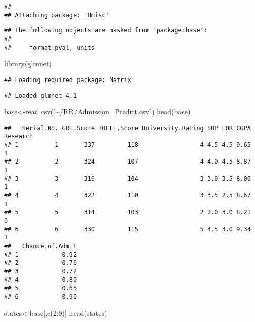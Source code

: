 \documentclass[
]{article}
\newenvironment{Shaded}{\begin{snugshade}}{\end{snugshade}}
\newcommand{\DecValTok}[1]{\textcolor[rgb]{0.00,0.00,0.81}{#1}}
\newcommand{\FunctionTok}[1]{\textcolor[rgb]{0.00,0.00,0.00}{#1}}
\newcommand{\NormalTok}[1]{#1}
\newcommand{\OtherTok}[1]{\textcolor[rgb]{0.56,0.35,0.01}{#1}}
\newcommand{\SpecialCharTok}[1]{\textcolor[rgb]{0.00,0.00,0.00}{#1}}
\newcommand{\StringTok}[1]{\textcolor[rgb]{0.31,0.60,0.02}{#1}}
\begin{document}
\begin{verbatim}
## 
## Attaching package: 'Hmisc'
\end{verbatim}

\begin{verbatim}
## The following objects are masked from 'package:base':
## 
##     format.pval, units
\end{verbatim}

\begin{Shaded}
\begin{Highlighting}[]
\FunctionTok{library}\NormalTok{(glmnet)}
\end{Highlighting}
\end{Shaded}

\begin{verbatim}
## Loading required package: Matrix
\end{verbatim}

\begin{verbatim}
## Loaded glmnet 4.1
\end{verbatim}

\begin{Shaded}
\begin{Highlighting}[]
\NormalTok{base}\OtherTok{\textless{}{-}}\FunctionTok{read.csv}\NormalTok{(}\StringTok{"\textasciitilde{}/RR/Admission\_Predict.csv"}\NormalTok{)}
\FunctionTok{head}\NormalTok{(base)}
\end{Highlighting}
\end{Shaded}

\begin{verbatim}
##   Serial.No. GRE.Score TOEFL.Score University.Rating SOP LOR CGPA Research
## 1          1       337         118                 4 4.5 4.5 9.65        1
## 2          2       324         107                 4 4.0 4.5 8.87        1
## 3          3       316         104                 3 3.0 3.5 8.00        1
## 4          4       322         110                 3 3.5 2.5 8.67        1
## 5          5       314         103                 2 2.0 3.0 8.21        0
## 6          6       330         115                 5 4.5 3.0 9.34        1
##   Chance.of.Admit
## 1            0.92
## 2            0.76
## 3            0.72
## 4            0.80
## 5            0.65
## 6            0.90
\end{verbatim}

\begin{Shaded}
\begin{Highlighting}[]
\NormalTok{states}\OtherTok{\textless{}{-}}\NormalTok{base[,}\FunctionTok{c}\NormalTok{(}\DecValTok{2}\SpecialCharTok{:}\DecValTok{9}\NormalTok{)]}
\FunctionTok{head}\NormalTok{(states)}
\end{Highlighting}
\end{Shaded}
\end{document}
